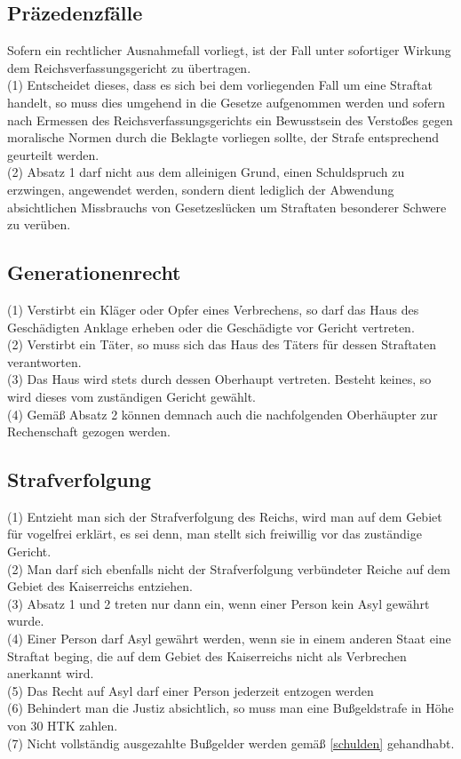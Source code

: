 \documentclass{article}
\begin{document}
\subsection{Präzedenzfälle} \label{praez}
Sofern ein rechtlicher Ausnahmefall vorliegt, ist der Fall unter sofortiger Wirkung dem Reichsverfassungsgericht zu übertragen.\\
(1) Entscheidet dieses, dass es sich bei dem vorliegenden Fall um eine Straftat handelt, so muss dies umgehend in die Gesetze aufgenommen werden und
sofern nach Ermessen des Reichsverfassungsgerichts ein Bewusstsein des Verstoßes gegen moralische Normen durch die Beklagte vorliegen sollte, der Strafe entsprechend
geurteilt werden.\\
(2) Absatz 1 darf nicht aus dem alleinigen Grund, einen Schuldspruch zu erzwingen, angewendet werden, sondern dient lediglich der Abwendung absichtlichen Missbrauchs von Gesetzeslücken um Straftaten besonderer Schwere zu verüben.

\subsection{Generationenrecht}
(1) Verstirbt ein Kläger oder Opfer eines Verbrechens, so darf das Haus des Geschädigten Anklage erheben oder die Geschädigte vor Gericht vertreten.\\
(2) Verstirbt ein Täter, so muss sich das Haus des Täters für dessen Straftaten verantworten.\\
(3) Das Haus wird stets durch dessen Oberhaupt vertreten. Besteht keines, so wird dieses vom zuständigen Gericht gewählt.\\
(4) Gemäß Absatz 2 können demnach auch die nachfolgenden Oberhäupter zur Rechenschaft gezogen werden.

\subsection{Strafverfolgung}
(1) Entzieht man sich der Strafverfolgung des Reichs, wird man auf dem Gebiet für vogelfrei erklärt, es sei denn, man stellt sich freiwillig vor das zuständige Gericht.\\
(2) Man darf sich ebenfalls nicht der Strafverfolgung verbündeter Reiche auf dem Gebiet des Kaiserreichs entziehen.\\
(3) Absatz 1 und 2 treten nur dann ein, wenn einer Person kein Asyl gewährt wurde.\\
(4) Einer Person darf Asyl gewährt werden, wenn sie in einem anderen Staat eine Straftat beging, die auf dem Gebiet des Kaiserreichs nicht als Verbrechen anerkannt wird.\\
(5) Das Recht auf Asyl darf einer Person jederzeit entzogen werden\\
(6) Behindert man die Justiz absichtlich, so muss man eine Bußgeldstrafe in Höhe von 30 HTK zahlen.\\
(7) Nicht vollständig ausgezahlte Bußgelder werden gemäß \ref{schulden} gehandhabt.
\end{document}
